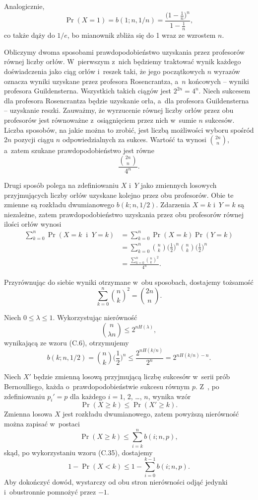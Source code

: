 Analogicznie,
\[
	\Pr(X=1) = b(1;n,1/n) = \frac{\bigl(1-\frac{1}{n}\bigr)^n}{1-\frac{1}{n}},
\]
co także dąży do $1/e$, bo mianownik zbliża się do 1 wraz ze wzrostem $n$.

\exercise %
Obliczymy dwoma sposobami prawdopodobieństwo uzyskania przez profesorów równej liczby orłów.
W~pierwszym z~nich będziemy traktować wynik każdego doświadczenia jako  ciąg orłów i~reszek taki, że jego początkowych $n$ wyrazów oznacza wyniki uzyskane przez profesora Rosencrantza, a~$n$ końcowych -- wyniki profesora Guildensterna.
Wszystkich takich ciągów jest $2^{2n}=4^n$.
Niech sukcesem dla profesora Rosencrantza będzie uzyskanie orła, a~dla profesora Guildensterna -- uzyskanie reszki.
Zauważmy, że wyrzucenie równej liczby orłów przez obu profesorów jest równoważne z~osiągnięciem przez nich w~sumie $n$ sukcesów.
Liczba sposobów, na jakie można to zrobić, jest liczbą możliwości wyboru spośród $2n$ pozycji ciągu $n$ odpowiedzialnych za sukces.
Wartość ta wynosi $\binom{2n}{n}$, a~zatem szukane prawdopodobieństwo jest równe
\[
	\frac{\binom{2n}{n}}{4^n}.
\]

Drugi sposób polega na zdefiniowaniu $X$ i~$Y$ jako zmiennych losowych przyjmujących liczby orłów uzyskane kolejno przez obu profesorów.
Obie te zmienne są rozkładu dwumianowego $b(k;n,1/2)$.
Zdarzenia $X=k$ i~$Y=k$ są niezależne, zatem prawdopodobieństwo uzyskania przez obu profesorów równej ilości orłów wynosi
\begin{align*}
	\sum_{k=0}^n\Pr(X=k\;\;\text{i}\;\;Y=k) &= \sum_{k=0}^n\Pr(X=k)\Pr(Y=k) \\
	&= \sum_{k=0}^n\binom{n}{k}\biggl(\frac{1}{2}\biggr)^n\binom{n}{k}\biggl(\frac{1}{2}\biggr)^n \\
	&= \frac{\sum_{k=0}^n\binom{n}{k}^2}{4^n}.
\end{align*}

Przyrównując do siebie wyniki otrzymane w~obu sposobach, dostajemy tożsamość
\[
	\sum_{k=0}^n\binom{n}{k}^2 = \binom{2n}{n}.
\]

\exercise %
Niech $0\le\lambda\le1$.
Wykorzystując nierówność
\[
	\binom{n}{\lambda n} \le 2^{nH(\lambda)},
\]
wynikającą ze wzoru (C.6), otrzymujemy
\[
	b(k;n,1/2) = \binom{n}{k}\biggl(\frac{1}{2}\biggr)^n \le \frac{2^{nH(k/n)}}{2^n} = 2^{nH(k/n)-n}.
\]

\exercise %

\noindent Niech $X'$ będzie zmienną losową przyjmującą liczbę sukcesów w~serii prób Bernoulliego, każda o~prawdopodobieństwie sukcesu równym $p$.
Z~, po zdefiniowaniu $p_i'=p$ dla każdego $i=1$, 2, \dots, $n$, wynika wzór
\[
    \Pr(X\ge k) \le \Pr(X'\ge k).
\]
Zmienna losowa $X$ jest rozkładu dwumianowego, zatem powyższą nierówność można zapisać w~postaci
\[
    \Pr(X\ge k) \le \sum_{i=k}^nb(i;n,p),
\]
skąd, po wykorzystaniu wzoru (C.35), dostajemy
\[
    1-\Pr(X<k) \le 1-\sum_{i=0}^{k-1}b(i;n,p).
\]
Aby dokończyć dowód, wystarczy od obu stron nierówności odjąć jedynki i~obustronnie pomnożyć przez $-1$.

